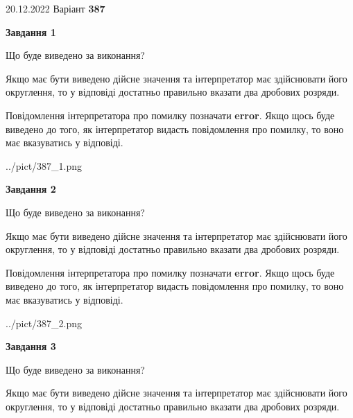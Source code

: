 \documentclass[12pt, ukrainian]{article}
\begin{document}
{20.12.2022 Варіант \No \textbf { 387 }\par}
{
\begin {Large}

{\begin {center}\textbf{Завдання 1}\end {center}}\par
Що буде виведено за виконання? \par

Якщо має бути виведено дійсне значення та інтерпретатор має здійснювати його округлення, 
то у відповіді достатньо правильно вказати два дробових розряди.

Повідомлення інтерпретатора про помилку позначати \textbf{error}.
Якщо щось буде виведено до того, як інтерпретатор видасть повідомлення про помилку, 
то воно має вказуватись у відповіді. \par

\begin{center}
	{../pict/387_1.png}
\end{center}
\newpage

{\begin {center}\textbf{Завдання 2}\end {center}}\par
Що буде виведено за виконання? \par

Якщо має бути виведено дійсне значення та інтерпретатор має здійснювати його округлення, 
то у відповіді достатньо правильно вказати два дробових розряди.

Повідомлення інтерпретатора про помилку позначати \textbf{error}.
Якщо щось буде виведено до того, як інтерпретатор видасть повідомлення про помилку, 
то воно має вказуватись у відповіді. \par

\begin{center}
	{../pict/387_2.png}
\end{center}
\newpage

{\begin {center}\textbf{Завдання 3}\end {center}}\par
Що буде виведено за виконання? \par

Якщо має бути виведено дійсне значення та інтерпретатор має здійснювати його округлення, 
то у відповіді достатньо правильно вказати два дробових розряди.


\end{Large}}
\end{document}

